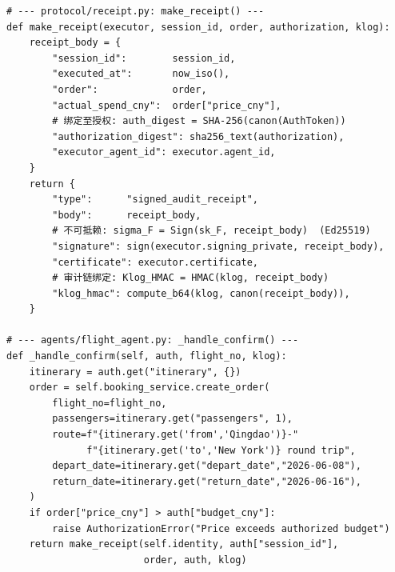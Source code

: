 \begin{lstlisting}[caption={protocol/receipt.py — make\_receipt() ; agents/flight\_agent.py — \_handle\_confirm()}]
# --- protocol/receipt.py: make_receipt() ---
def make_receipt(executor, session_id, order, authorization, klog):
    receipt_body = {
        "session_id":        session_id,
        "executed_at":       now_iso(),
        "order":             order,
        "actual_spend_cny":  order["price_cny"],
        # 绑定至授权: auth_digest = SHA-256(canon(AuthToken))
        "authorization_digest": sha256_text(authorization),
        "executor_agent_id": executor.agent_id,
    }
    return {
        "type":      "signed_audit_receipt",
        "body":      receipt_body,
        # 不可抵赖: sigma_F = Sign(sk_F, receipt_body)  (Ed25519)
        "signature": sign(executor.signing_private, receipt_body),
        "certificate": executor.certificate,
        # 审计链绑定: Klog_HMAC = HMAC(klog, receipt_body)
        "klog_hmac": compute_b64(klog, canon(receipt_body)),
    }

# --- agents/flight_agent.py: _handle_confirm() ---
def _handle_confirm(self, auth, flight_no, klog):
    itinerary = auth.get("itinerary", {})
    order = self.booking_service.create_order(
        flight_no=flight_no,
        passengers=itinerary.get("passengers", 1),
        route=f"{itinerary.get('from','Qingdao')}-"
              f"{itinerary.get('to','New York')} round trip",
        depart_date=itinerary.get("depart_date","2026-06-08"),
        return_date=itinerary.get("return_date","2026-06-16"),
    )
    if order["price_cny"] > auth["budget_cny"]:
        raise AuthorizationError("Price exceeds authorized budget")
    return make_receipt(self.identity, auth["session_id"],
                        order, auth, klog)
\end{lstlisting}